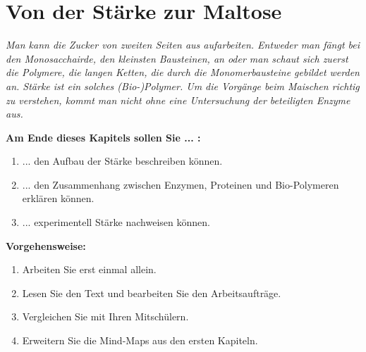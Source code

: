 \documentclass{scrartcl}  %
\begin{document}
	\section{Von der Stärke zur Maltose}
	
		\textit{Man kann die Zucker von zweiten Seiten aus aufarbeiten. Entweder man fängt bei den Monosacchairde, den kleinsten Bausteinen, an oder man schaut sich zuerst die Polymere, die langen Ketten, die durch die Monomerbausteine gebildet werden an. Stärke ist ein solches (Bio-)Polymer. 
		Um die Vorgänge beim Maischen richtig zu verstehen, kommt man nicht ohne eine Untersuchung der beteiligten Enzyme aus. } \newline
	
		\begin{minipage}{0.7\textwidth}
			\noindent \textbf{Am Ende dieses Kapitels sollen Sie ... :}
			\begin{enumerate}
				\item ... den Aufbau der Stärke beschreiben können.
				\item ... den Zusammenhang zwischen Enzymen, Proteinen und Bio-Polymeren erklären können.
				\item ... experimentell Stärke nachweisen können.
			\end{enumerate}
			\textbf{Vorgehensweise:}
			\begin{enumerate}
				\item Arbeiten Sie erst einmal allein.
				\item Lesen Sie den Text und bearbeiten Sie den Arbeitsaufträge.
				\item Vergleichen Sie mit Ihren Mitschülern.
				\item Erweitern Sie die Mind-Maps aus den ersten Kapiteln. 
			\end{enumerate}
			
		\end{minipage}
		\hspace{0.1\textwidth}
\end{document}
